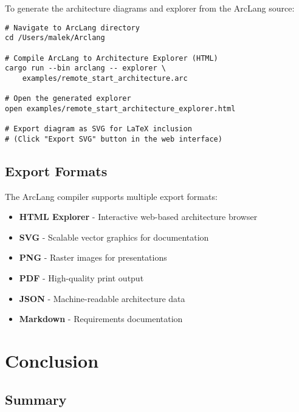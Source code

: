 \documentclass[11pt,a4paper]{article}
\begin{document}
To generate the architecture diagrams and explorer from the ArcLang source:

\begin{tcolorbox}[colback=codebg,colframe=black,title=Compilation Commands]
\begin{verbatim}
# Navigate to ArcLang directory
cd /Users/malek/Arclang

# Compile ArcLang to Architecture Explorer (HTML)
cargo run --bin arclang -- explorer \
    examples/remote_start_architecture.arc

# Open the generated explorer
open examples/remote_start_architecture_explorer.html

# Export diagram as SVG for LaTeX inclusion
# (Click "Export SVG" button in the web interface)
\end{verbatim}
\end{tcolorbox}

\subsection{Export Formats}

The ArcLang compiler supports multiple export formats:

\begin{itemize}[leftmargin=*]
    \item \textbf{HTML Explorer} - Interactive web-based architecture browser
    \item \textbf{SVG} - Scalable vector graphics for documentation
    \item \textbf{PNG} - Raster images for presentations
    \item \textbf{PDF} - High-quality print output
    \item \textbf{JSON} - Machine-readable architecture data
    \item \textbf{Markdown} - Requirements documentation
\end{itemize}

\section{Conclusion}

\subsection{Summary}
\end{document}
